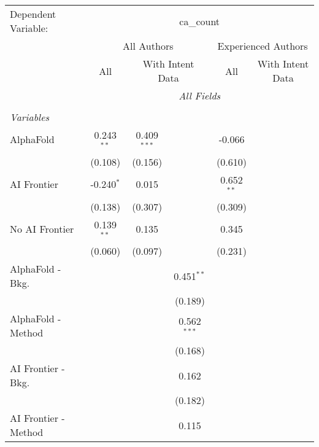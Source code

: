 \begingroup
\centering
\begin{tabular}{lcccccc}
   \tabularnewline \midrule \midrule
   Dependent Variable: & \multicolumn{6}{c}{ca\_count}\\
 & \multicolumn{3}{c}{All Authors} & \multicolumn{3}{c}{Experienced Authors} \\
\cmidrule(lr){2-4} \cmidrule(lr){5-7}
 & \multicolumn{1}{c}{All} & \multicolumn{2}{c}{With Intent Data} & \multicolumn{1}{c}{All} & \multicolumn{2}{c}{With Intent Data} \\
\cmidrule(lr){2-2} \cmidrule(lr){3-4} \cmidrule(lr){5-5} \cmidrule(lr){6-7}
 & \multicolumn{6}{c}{\textit{All Fields}} \\ \\
   \emph{Variables}\\
   AlphaFold               & 0.243$^{**}$ & 0.409$^{***}$ &               & -0.066       &        &   \\   
                           & (0.108)      & (0.156)       &               & (0.610)      &        &   \\   
   AI Frontier             & -0.240$^{*}$ & 0.015         &               & 0.652$^{**}$ &        &   \\   
                           & (0.138)      & (0.307)       &               & (0.309)      &        &   \\   
   No AI Frontier          & 0.139$^{**}$ & 0.135         &               & 0.345        &        &   \\   
                           & (0.060)      & (0.097)       &               & (0.231)      &        &   \\   
   AlphaFold - Bkg.        &              &               & 0.451$^{**}$  &              &        &   \\   
                           &              &               & (0.189)       &              &        &   \\   
   AlphaFold - Method      &              &               & 0.562$^{***}$ &              &        &   \\   
                           &              &               & (0.168)       &              &        &   \\   
   AI Frontier - Bkg.      &              &               & 0.162         &              &        &   \\   
                           &              &               & (0.182)       &              &        &   \\   
   AI Frontier - Method    &              &               & 0.115         &              &        &   \\   

\end{tabular}
